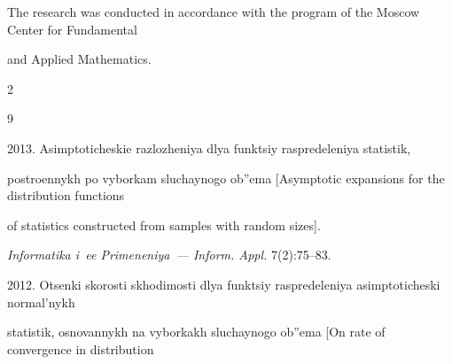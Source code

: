 




 \Ack


\noindent


The research was conducted in accordance with the program of the Moscow Center for Fundamental 


and Applied Mathematics.










  \begin{multicols}{2}





\renewcommand{\bibname}{\protect\rmfamily References}







{\small\frenchspacing


 {%




 \begin{thebibliography}{9}






 2013. Asimptoticheskie razlozheniya dlya funktsiy raspredeleniya statistik, 


 postroennykh po vyborkam sluchaynogo ob''ema [Asymptotic expansions for the distribution functions 


 of statistics constructed from samples with random sizes]. 


 \textit{Informatika i~ee Primeneniya~--- Inform. Appl.} 7(2):75--83.






 2012. Otsenki skorosti skhodimosti dlya funktsiy raspredeleniya asimptoticheski normal'nykh 


 statistik, osnovannykh na vyborkakh sluchaynogo ob''ema [On rate of convergence in distribution 



\end{thebibliography}}}
\end{multicols}
